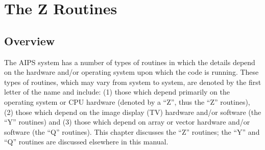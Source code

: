 \setcounter{chapter}{14} %
\chapter{The Z Routines}
\setcounter{page}{1}
\section{Overview }

The AIPS system has a number of types of routines in which the details
depend on the hardware and/or operating system upon which the code is
running.  These types of routines, which may vary from system to
system, are denoted by the first letter of the name and include: (1)
those which depend primarily on the operating system or CPU hardware
(denoted by a ``Z'', thus the ``Z'' routines), (2) those which depend on
the image display (TV) hardware and/or software (the ``Y'' routines) and
(3) those which depend on array or vector hardware and/or software
(the ``Q'' routines).  This chapter discusses the ``Z'' routines; the ``Y''
and ``Q'' routines are discussed elsewhere in this manual.

